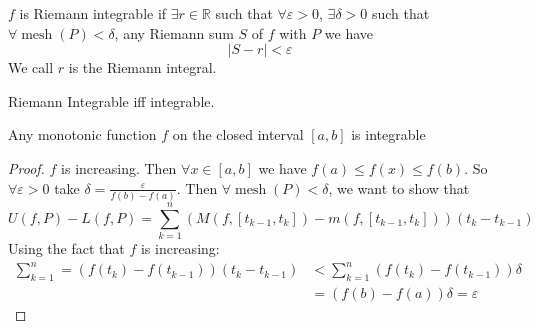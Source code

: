 \documentclass{report}
\begin{document}
$f$ is Riemann integrable if $\exists r \in  \mathbb{ R}$ such that $\forall \varepsilon>  0$, $\exists \delta >  0$ such that $\forall \mathop{ mesh}(P) < \delta$, any Riemann sum $S$ of $f$ with $P$ we have
    \begin{equation*}
        \lvert S - r \rvert <  \varepsilon
    \end{equation*}  
We call $r$ is the Riemann integral.

\begin{theorem}{32.9}
    Riemann Integrable iff integrable.
\end{theorem}

\begin{theorem}{33.1}
    Any monotonic function $f$ on the closed interval $[a, b]$ is integrable 
\end{theorem}
    \begin{proof}
        $f$ is increasing. Then $\forall x \in  [ a, b]$ we have $f(a) \leq f( x) \leq f( b)$. So $\forall \varepsilon>  0$ take $\delta = \frac{ \varepsilon}{ f(b) - f(a)}$. Then $\forall \mathop{ mesh}(P) < \delta$, we want to show that
            \begin{equation*}
                U(f, P) - L(f, P) = \sum_{ k = 1}^{n}(M(f, [t_{k - 1}, t_{k}]) - m(f, [t_{k - 1}, t_{k}]) )(t_{k} - t_{k - 1})
            \end{equation*}
        Using the fact that $f$ is increasing:
            \begin{align*}
                \sum_{k = 1}^{n} = (f(t_{k}) - f(t_{k - 1}))(t_{k} - t_{k - 1}) &< \sum_{ k = 1}^{n}(f(t_{k}) - f(t_{k - 1}))\delta \\
                                                                                &= ( f(b) - f(a))\delta = \varepsilon
            \end{align*}
    \end{proof}
\end{document}
